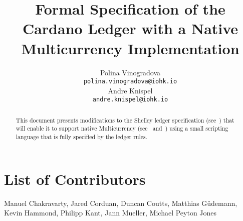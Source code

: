 
\title{Formal Specification of the Cardano Ledger with a Native
Multicurrency Implementation}
\renewcommand{\thepage}{\arabic{page}}
\setcounter{page}{1}

\author{
   Polina Vinogradova \\ {\small \texttt{polina.vinogradova@iohk.io}} \\
   Andre Knispel \\ {\small \texttt{andre.knispel@iohk.io}} \\
   }

\date{}

\maketitle

\begin{abstract}
This document presents modifications to the Shelley ledger
specification
(see~\cite{shelley_spec}) that will enable it to support native
Multicurrency (see~\cite{multi_currency} and~\cite{formal_multicur})
using a small scripting language that is fully specified
by the ledger rules.
\end{abstract}

\section*{List of Contributors}
\label{acknowledgements}

Manuel Chakravarty,
Jared Corduan,
Duncan Coutts,
Matthias G\"{u}demann,
Kevin Hammond,
Philipp Kant,
Jann Mueller,
Michael Peyton Jones
